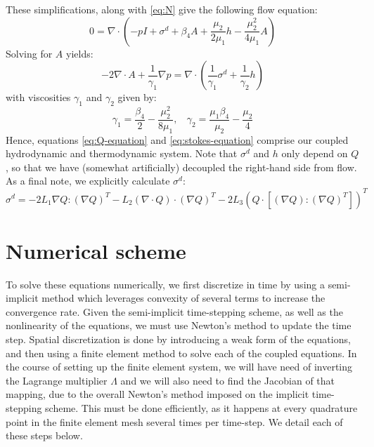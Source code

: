 \documentclass[reqno]{article}
\begin{document}
  These simplifications, along with \eqref{eq:N} give the following flow equation:
  \begin{equation} \label{eq:linearized-hydrodynamics}
    0
    =
    \nabla \cdot \left(
      -p I
      + \sigma^d
      + \beta_4 A
      + \frac{\mu_2}{2 \mu_1} h - \frac{\mu_2^2}{4 \mu_1} A
    \right)
  \end{equation}
  Solving for $A$ yields:
  \begin{equation} \label{eq:stokes-equation}
    -2 \nabla \cdot A + \frac{1}{\gamma_1} \nabla p
    =
    \nabla \cdot \left(
      \frac{1}{\gamma_1} \sigma^d
      + \frac{1}{\gamma_2} h
    \right)
  \end{equation}
  with viscosities $\gamma_1$ and $\gamma_2$ given by:
  \begin{equation}
    \gamma_1
    =
    \frac{\beta_4}{2} - \frac{\mu_2^2}{8 \mu_1},
    \:\:\:\:
    \gamma_2
    =
    \frac{\mu_1 \beta_4}{\mu_2} - \frac{\mu_2}{4}
  \end{equation}
  Hence, equations \eqref{eq:Q-equation} and \eqref{eq:stokes-equation} comprise
  our coupled hydrodynamic and thermodynamic system.
  Note that $\sigma^d$ and $h$ only depend on $Q$, so that we have (somewhat
  artificially) decoupled the right-hand side from flow.
  As a final note, we explicitly calculate $\sigma^d$:
  \begin{equation}
    \sigma^d
    =
    - 2 L_1 \nabla Q : \left( \nabla Q \right)^T
    - L_2 \left( \nabla \cdot Q \right) \cdot \left( \nabla Q \right)^T
    - 2 L_3 \left( Q \cdot \left[ \left( \nabla Q \right) : \left( \nabla Q \right)^T \right] \right)^T
  \end{equation}
  
  \section{Numerical scheme} \label{numerical-scheme}
  To solve these equations numerically, we first discretize in time by using a
  semi-implicit method which leverages convexity of several terms to increase
  the convergence rate.
  Given the semi-implicit time-stepping scheme, as well as the nonlinearity of
  the equations, we must use Newton's method to update the time step.
  Spatial discretization is done by introducing a weak form of the equations,
  and then using a finite element method to solve each of the coupled equations.
  In the course of setting up the finite element system, we will have need of
  inverting the Lagrange multiplier $\Lambda$ and we will also need to find the
  Jacobian of that mapping, due to the overall Newton's method imposed on the
  implicit time-stepping scheme.
  This must be done efficiently, as it happens at every quadrature point in the
  finite element mesh several times per time-step.
  We detail each of these steps below.
\end{document}
